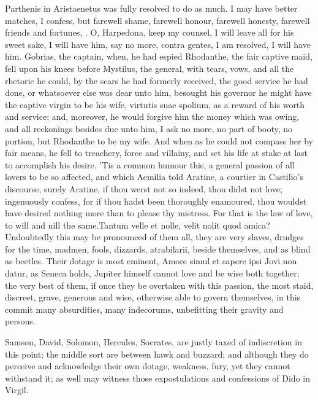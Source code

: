 {Parthenis in Aristaenetus was fully resolved to do as much. I may
have better matches, I confess, but farewell shame, farewell honour,
farewell honesty, farewell friends and fortunes, \etc{}. O, Harpedona, keep
my counsel, I will leave all for his sweet sake, I will have him, say
no more, contra gentes, I am resolved, I will have him. Gobrias,
the captain, when, he had espied Rhodanthe, the fair captive maid, fell
upon his knees before Mystilus, the general, with tears, vows, and all
the rhetoric he could, by the scars he had formerly received, the good
service he had done, or whatsoever else was dear unto him, besought his
governor he might have the captive virgin to be his wife, virtutis suae
spolium, as a reward of his worth and service; and, moreover, he would
forgive him the money which was owing, and all reckonings besides due
unto him, I ask no more, no part of booty, no portion, but Rhodanthe to
be my wife. And when as he could not compass her by fair means, he fell
to treachery, force and villainy, and set his life at stake at last to
accomplish his desire. 'Tis a common humour this, a general passion of
all lovers to be so affected, and which Aemilia told Aratine, a
courtier in Castilio's discourse, surely Aratine, if thou werst not so
indeed, thou didst not love; ingenuously confess, for if thou hadst
been thoroughly enamoured, thou wouldst have desired nothing more than
to please thy mistress. For that is the law of love, to will and nill
the same.Tantum velle et nolle, velit nolit quod amica?
Undoubtedly this may be pronounced of them all, they are very slaves,
drudges for the time, madmen, fools, dizzards, atrabilarii,
beside themselves, and as blind as beetles. Their dotage is most
eminent, Amore simul et sapere ipsi Jovi non datur, as Seneca holds,
Jupiter himself cannot love and be wise both together; the very best of
them, if once they be overtaken with this passion, the most staid,
discreet, grave, generous and wise, otherwise able to govern
themselves, in this commit many absurdities, many indecorums,
unbefitting their gravity and persons.

Samson, David, Solomon, Hercules, Socrates, \etc{} are justly taxed of
indiscretion in this point; the middle sort are between hawk and
buzzard; and although they do perceive and acknowledge their own
dotage, weakness, fury, yet they cannot withstand it; as well may
witness those expostulations and confessions of Dido in Virgil.

}
